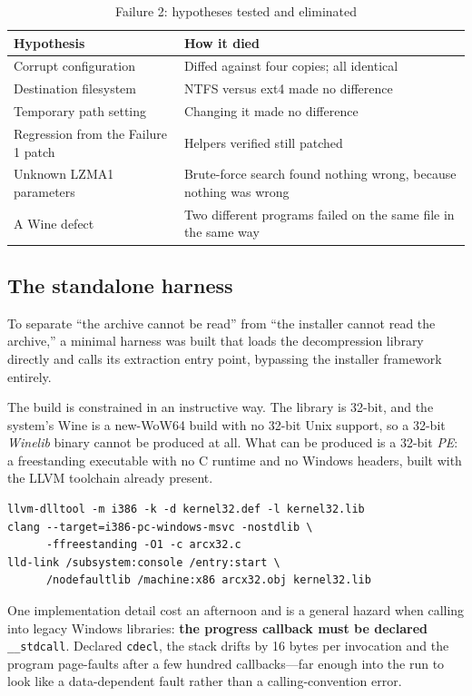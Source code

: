 \begin{table}[htbp]
\caption{Failure 2: hypotheses tested and eliminated}
\label{tab:deadends}
\centering
\footnotesize
\begin{tabularx}{\columnwidth}{@{}L{2.7cm}X@{}}
\toprule
\textbf{Hypothesis} & \textbf{How it died} \\
\midrule
Corrupt configuration & Diffed against four copies; all identical \\
Destination filesystem & NTFS versus ext4 made no difference \\
Temporary path setting & Changing it made no difference \\
Regression from the Failure 1 patch & Helpers verified still patched \\
Unknown LZMA1 parameters & Brute-force search found nothing wrong, because
                            nothing was wrong \\
A Wine defect & Two different programs failed on the same file in the same way \\
\bottomrule
\end{tabularx}
\end{table}

\subsection{The standalone harness}

To separate ``the archive cannot be read'' from ``the installer cannot read the
archive,'' a minimal harness was built that loads the decompression library
directly and calls its extraction entry point, bypassing the installer framework
entirely.

The build is constrained in an instructive way. The library is 32-bit, and the
system's Wine is a new-WoW64 build with no 32-bit Unix support, so a 32-bit
\emph{Winelib} binary cannot be produced at all. What can be produced is a 32-bit
\emph{PE}: a freestanding executable with no C runtime and no Windows headers,
built with the LLVM toolchain already present.

\begin{lstlisting}
llvm-dlltool -m i386 -k -d kernel32.def -l kernel32.lib
clang --target=i386-pc-windows-msvc -nostdlib \
      -ffreestanding -O1 -c arcx32.c
lld-link /subsystem:console /entry:start \
      /nodefaultlib /machine:x86 arcx32.obj kernel32.lib
\end{lstlisting}

One implementation detail cost an afternoon and is a general hazard when calling
into legacy Windows libraries: \textbf{the progress callback must be declared}
\verb|__stdcall|. Declared \verb|cdecl|, the stack drifts by 16 bytes per
invocation and the program page-faults after a few hundred callbacks---far enough
into the run to look like a data-dependent fault rather than a calling-convention
error.
